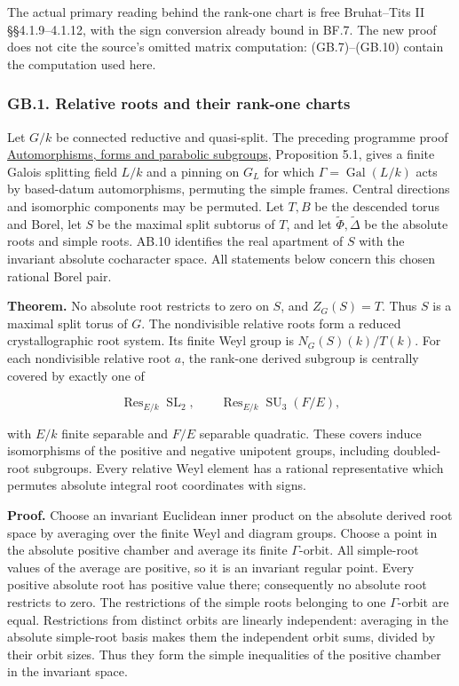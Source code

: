 \documentclass[
  11pt,
]{article}
\begin{document}
The actual primary reading behind the rank-one chart is free
Bruhat--Tits II §§4.1.9--4.1.12, with the sign conversion already bound
in BF.7. The new proof does not cite the source's omitted matrix
computation: (GB.7)--(GB.10) contain the computation used here.

\subsubsection{GB.1. Relative roots and their rank-one
charts}\label{gb.1.-relative-roots-and-their-rank-one-charts}

Let \(G/k\) be connected reductive and quasi-split. The preceding
programme proof \href{../AG-RG/AG-RG-06.html}{Automorphisms, forms and
parabolic subgroups}, Proposition 5.1, gives a finite Galois splitting
field \(L/k\) and a pinning on \(G_L\) for which
\(\Gamma=\operatorname{Gal}(L/k)\) acts by based-datum automorphisms,
permuting the simple frames. Central directions and isomorphic
components may be permuted. Let \(T,B\) be the descended torus and
Borel, let \(S\) be the maximal split subtorus of \(T\), and let
\(\widetilde\Phi,\widetilde\Delta\) be the absolute roots and simple
roots. AB.10 identifies the real apartment of \(S\) with the invariant
absolute cocharacter space. All statements below concern this chosen
rational Borel pair.

\textbf{Theorem.} No absolute root restricts to zero on \(S\), and
\(Z_G(S)=T\). Thus \(S\) is a maximal split torus of \(G\). The
nondivisible relative roots form a reduced crystallographic root system.
Its finite Weyl group is \(N_G(S)(k)/T(k)\). For each nondivisible
relative root \(a\), the rank-one derived subgroup is centrally covered
by exactly one of

\[
 \operatorname{Res}_{E/k}\operatorname{SL}_2,
 \qquad \operatorname{Res}_{E/k}\operatorname{SU}_3(F/E),
 \tag{GB.11}
\]

with \(E/k\) finite separable and \(F/E\) separable quadratic. These
covers induce isomorphisms of the positive and negative unipotent
groups, including doubled-root subgroups. Every relative Weyl element
has a rational representative which permutes absolute integral root
coordinates with signs.

\textbf{Proof.} Choose an invariant Euclidean inner product on the
absolute derived root space by averaging over the finite Weyl and
diagram groups. Choose a point in the absolute positive chamber and
average its finite \(\Gamma\)-orbit. All simple-root values of the
average are positive, so it is an invariant regular point. Every
positive absolute root has positive value there; consequently no
absolute root restricts to zero. The restrictions of the simple roots
belonging to one \(\Gamma\)-orbit are equal. Restrictions from distinct
orbits are linearly independent: averaging in the absolute simple-root
basis makes them the independent orbit sums, divided by their orbit
sizes. Thus they form the simple inequalities of the positive chamber in
the invariant space.
\end{document}
